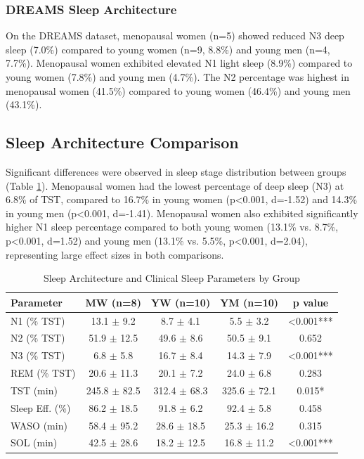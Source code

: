 \documentclass[a4paper,fleqn]{cas-dc}
\begin{document}
\subsubsection{DREAMS Sleep Architecture}

On the DREAMS dataset, menopausal women (n=5) showed reduced N3 deep sleep (7.0\%) compared to young women (n=9, 8.8\%) and young men (n=4, 7.7\%). Menopausal women exhibited elevated N1 light sleep (8.9\%) compared to young women (7.8\%) and young men (4.7\%). The N2 percentage was highest in menopausal women (41.5\%) compared to young women (46.4\%) and young men (43.1\%).

\subsection{Sleep Architecture Comparison}

Significant differences were observed in sleep stage distribution between groups (Table \ref{tab:sleep_stats}). Menopausal women had the lowest percentage of deep sleep (N3) at 6.8\% of TST, compared to 16.7\% in young women (p<0.001, d=-1.52) and 14.3\% in young men (p<0.001, d=-1.41). Menopausal women also exhibited significantly higher N1 sleep percentage compared to both young women (13.1\% vs. 8.7\%, p<0.001, d=1.52) and young men (13.1\% vs. 5.5\%, p<0.001, d=2.04), representing large effect sizes in both comparisons.

\begin{table}[!ht]
\centering
\caption{Sleep Architecture and Clinical Sleep Parameters by Group}
\label{tab:sleep_stats}
\begin{tabular*}{\textwidth}{@{\extracolsep\fill}lcccc@{\extracolsep\fill}}
\toprule
\textbf{Parameter} & \textbf{MW (n=8)} & \textbf{YW (n=10)} & \textbf{YM (n=10)} & \textbf{p value} \\
\midrule
N1 (\% TST) & 13.1 $\pm$ 9.2 & 8.7 $\pm$ 4.1 & 5.5 $\pm$ 3.2 & <0.001*** \\
N2 (\% TST) & 51.9 $\pm$ 12.5 & 49.6 $\pm$ 8.6 & 50.5 $\pm$ 9.1 & 0.652 \\
N3 (\% TST) & 6.8 $\pm$ 5.8 & 16.7 $\pm$ 8.4 & 14.3 $\pm$ 7.9 & <0.001*** \\
REM (\% TST) & 20.6 $\pm$ 11.3 & 20.1 $\pm$ 7.2 & 24.0 $\pm$ 6.8 & 0.283 \\
TST (min) & 245.8 $\pm$ 82.5 & 312.4 $\pm$ 68.3 & 325.6 $\pm$ 72.1 & 0.015* \\
Sleep Eff. (\%) & 86.2 $\pm$ 18.5 & 91.8 $\pm$ 6.2 & 92.4 $\pm$ 5.8 & 0.458 \\
WASO (min) & 58.4 $\pm$ 95.2 & 28.6 $\pm$ 18.5 & 25.3 $\pm$ 16.2 & 0.315 \\
SOL (min) & 42.5 $\pm$ 28.6 & 18.2 $\pm$ 12.5 & 16.8 $\pm$ 11.2 & <0.001*** \\
\bottomrule
\end{tabular*}
\end{table}
\end{document}
